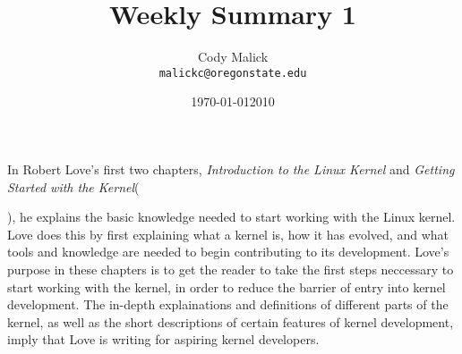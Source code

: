 \documentclass[10pt,letterpaper]{article}
\begin{document}
  \title{Weekly Summary 1}
  \author{Cody Malick\\
  \texttt{malickc@oregonstate.edu}}
  \date{\today}
  \maketitle

    In Robert Love's first two chapters, \textit{Introduction to the Linux
    Kernel} and \textit{Getting Started with the Kernel}(\date{2010}), he
    explains the basic knowledge needed to start working with the Linux kernel.
    Love does this by first explaining what a kernel is, how it has evolved, and
    what tools and knowledge are needed to begin contributing to its
    development. Love's purpose in these chapters is to get the reader to take
    the first steps neccessary to start working with the kernel, in order to
    reduce the barrier of entry into kernel development. The in-depth
    explainations and definitions of different parts of the kernel, as well
    as the short descriptions of certain features of kernel development, imply
    that Love is writing for aspiring kernel developers.
\end{document}
